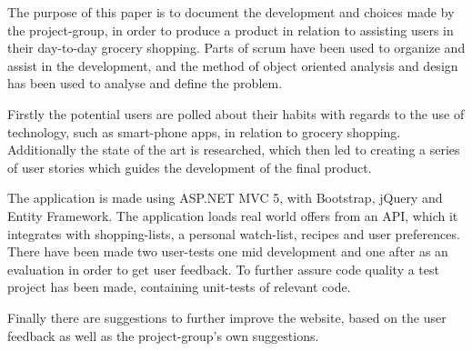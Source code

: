 The purpose of this paper is to document the development and choices made by the project-group, in order to produce a product in relation to assisting users in their day-to-day grocery shopping. 
Parts of scrum have been used to organize and assist in the development, and the method of object oriented analysis and design has been used to analyse and define the problem. 

Firstly the potential users are polled about their habits with regards to the use of technology, such as smart-phone apps, in relation to grocery shopping.
Additionally the state of the art is researched, which then led to creating a series of user stories which guides the development of the final product.

The application is made using ASP.NET MVC 5, with Bootstrap, jQuery and Entity Framework. 
The application loads real world offers from an API, which it integrates with shopping-lists, a personal watch-list, recipes and user preferences. 
There have been made two user-tests one mid development and one after as an evaluation in order to get user feedback.
To further assure code quality a test project has been made, containing unit-tests of relevant code.

Finally there are suggestions to further improve the website, based on the user feedback as well as the project-group's own suggestions.


